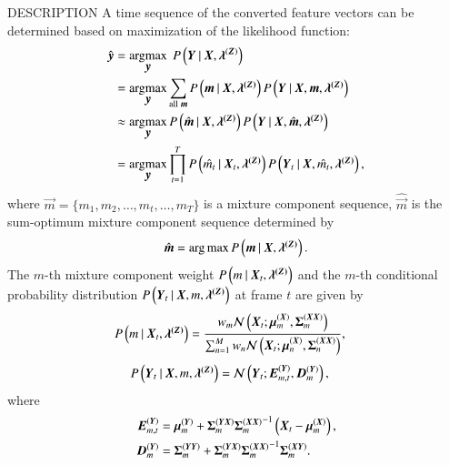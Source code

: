 \begin{qsection}{DESCRIPTION}
 A time sequence of the converted feature vectors can be determined based on
 maximization of the likelihood function:
 \begin{align*}
  \hat{\vec{y}} &= \argmax_{\vec{y}} \;P\left(\vec{Y}\mid \vec{X},
  \vec{\lambda}\dim{\sZ}\right)\\
  & = \argmax_{\vec{y}} \Sum_{\mathrm{all}\; \sm}
  P\left(\vec{m}\mid \vec{X}, \vec{\lambda\dim{\sZ}} \right)
  P\left(\vec{Y} \mid \vec{X}, \vec{m}, \vec{\lambda\dim{\sZ}}\right) \\
  & \approx \argmax_{\vec{y}} P\left(\hat{\vec{m}}\mid \vec{X}, \vec{\lambda\dim{\sZ}} \right)
  P\left(\vec{Y} \mid \vec{X}, \hat{\vec{m}}, \vec{\lambda\dim{\sZ}}\right) \\
  & = \argmax_{\vec{y}} \Prod_{t=1}^{T} P\left(\hat{m_{t}} \mid \vec{X}_{t},
  \vec{\lambda\dim{\sZ}} \right)
  P\left(\vec{Y}_{t} \mid \vec{X}, \hat{m_{t}}, \vec{\lambda\dim{\sZ}}\right),
 \end{align*}
 where $\vec{m} = \{m_{1}, m_{2}, \ldots, m_{t}, \ldots, m_{T}\}$ is a mixture
 component sequence, $\hat{\vec{m}}$ is the sum-optimum mixture component sequence
 determined by
 \begin{align*}
  \hat{\vec{m}} = \arg\max P\left(\vec{m}\mid \vec{X}, \vec{\lambda\dim{\sZ}}\right).
 \end{align*}
 The $m$-th mixture component weight $P\left(m\mid \vec{X}_{t},
 \vec{\lambda\dim{\sZ}} \right)$ and the $m$-th conditional probability distribution
 $P\left(\vec{Y}_{t} \mid \vec{X}, m, \vec{\lambda\dim{\sZ}}\right)$ at frame $t$ are
 given by
 \begin{align*}
  P\left(m\mid \vec{X}_{t}, \vec{\lambda\dim{\sZ}} \right)
  &= \frac{w_{m} \mathcal{N}\left(\vec{X}_{t} ;
  \vec{\mu}\dim{\sX}_{m}, \vec{\Sigma}\dim{\sX\sX}_{m}\right)}
  {\sum_{n=1}^{M} w_{n} \mathcal{N}\left(\vec{X}_{t} ;
  \vec{\mu}\dim{\sX}_{n}, \vec{\Sigma}\dim{\sX\sX}_{n}\right)},
  \end{align*}
 \begin{align*}
  P\left(\vec{Y}_{t} \mid \vec{X}, m, \vec{\lambda\dim{\sZ}}\right)
  &= \mathcal{N}\left(\vec{Y}_{t} ; \vec{E}\dim{\sY}_{m,t},
  \vec{D}\dim{\sY}_{m}\right),
  \end{align*}
 where
 \begin{align*}
  \vec{E}\dim{\sY}_{m,t} &= \vec{\mu}\dim{\sY}_{m}
  + \vec{\Sigma}\dim{\sY\sX}_{m} {\vec{\Sigma}\dim{\sX\sX}_{m}}\inv
  \left(\vec{X}_{t} - \vec{\mu}\dim{\sX}_{m}\right), \\
  \vec{D}\dim{\sY}_{m} &= \vec{\Sigma}\dim{\sY\sY}_{m} 
  + \vec{\Sigma}\dim{\sY\sX}_{m} {\vec{\Sigma}\dim{\sX\sX}_{m}}\inv
  \vec{\Sigma}\dim{\sX\sY}_{m}.
 \end{align*}


\end{qsection}
